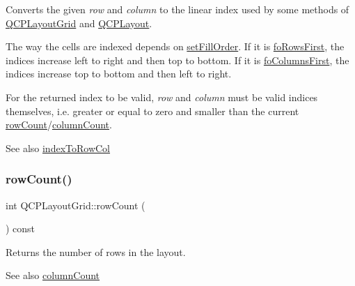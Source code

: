 Converts the given {\itshape row} and {\itshape column} to the linear index used by some methods of \hyperlink{classQCPLayoutGrid}{Q\+C\+P\+Layout\+Grid} and \hyperlink{classQCPLayout}{Q\+C\+P\+Layout}.

The way the cells are indexed depends on \hyperlink{classQCPLayoutGrid_affc2f3cfd22f28698c5b29b960d2a391}{set\+Fill\+Order}. If it is \hyperlink{classQCPLayoutGrid_a7d49ee08773de6b2fd246edfed353ccaa0202730954e26c474cc820164aedce3e}{fo\+Rows\+First}, the indices increase left to right and then top to bottom. If it is \hyperlink{classQCPLayoutGrid_a7d49ee08773de6b2fd246edfed353ccaac4cb4b796ec4822d5894b47b51627fb3}{fo\+Columns\+First}, the indices increase top to bottom and then left to right.

For the returned index to be valid, {\itshape row} and {\itshape column} must be valid indices themselves, i.\+e. greater or equal to zero and smaller than the current \hyperlink{classQCPLayoutGrid_a19c66fd76cbce58a8e94f33797e0c0aa}{row\+Count}/\hyperlink{classQCPLayoutGrid_a1a2962cbf45011405b64b913afa8e7a2}{column\+Count}.

\begin{DoxySeeAlso}{See also}
\hyperlink{classQCPLayoutGrid_a577223db920e2acb34bc1091080c76d1}{index\+To\+Row\+Col} 
\end{DoxySeeAlso}
\mbox{\label{classQCPLayoutGrid_a19c66fd76cbce58a8e94f33797e0c0aa}} 
\subsubsection{\texorpdfstring{row\+Count()}{rowCount()}}
{\footnotesize\ttfamily int Q\+C\+P\+Layout\+Grid\+::row\+Count (\begin{DoxyParamCaption}{ }\end{DoxyParamCaption}) const\hspace{0.3cm}{\ttfamily [inline]}}

Returns the number of rows in the layout.

\begin{DoxySeeAlso}{See also}
\hyperlink{classQCPLayoutGrid_a1a2962cbf45011405b64b913afa8e7a2}{column\+Count} 
\end{DoxySeeAlso}
\mbox{\label{classQCPLayoutGrid_a3a49272aba32bb0fddc3bb2a45a3dba0}} 

